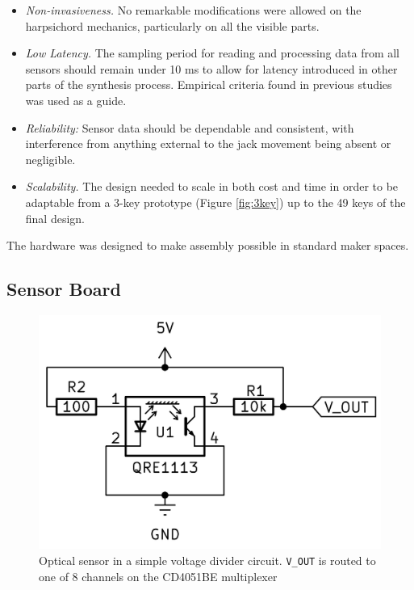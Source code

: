\begin{itemize}
    \item \emph{Non-invasiveness.} No remarkable modifications were allowed on the harpsichord mechanics, particularly on all the visible parts.
    \item \emph{Low Latency.} The sampling period for reading and processing data from all sensors should remain under 10 ms to allow for latency introduced in other parts of the synthesis process. Empirical criteria found in previous studies \cite{Jack2016} was used as a guide.
    \item \emph{Reliability:} Sensor data should be dependable and consistent, with interference from anything external to the jack movement being absent or negligible.
    \item \emph{Scalability.} The design needed to scale in both cost and time in order to be adaptable from a 3-key prototype (Figure \ref{fig:3key}) up to the 49 keys of the final design.
\end{itemize}

The hardware was designed to make assembly possible in standard maker spaces.  

\subsection{Sensor Board}\label{sensor-board}

\begin{figure}[!b] 
  \centering
  \includegraphics[width=0.7\linewidth]{src/images/simple-schematic-bw-.jpg} 
  \caption{Optical sensor in a simple voltage divider circuit. \texttt{V\_OUT} is routed to one of 8 channels on the CD4051BE multiplexer}
  \Description{} 
  \label{fig:simple-schematic}
\end{figure}

